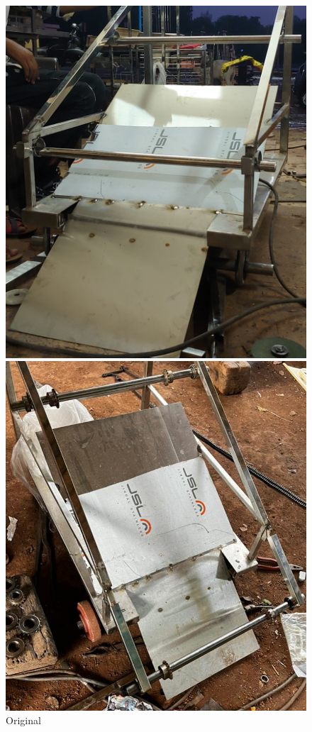 \begin{figure}[H]
  \centering
    \begin{minipage}{0.40\textwidth}
    \centering
      \includegraphics[width=1\textwidth]{Original.jpg}
      \caption{Original}
      \label{fig:Original}
    \end{minipage}
    \begin{minipage}{0.40\textwidth}
    \centering
      \includegraphics[width=1\textwidth]{Improved.jpg}

\end{minipage}
\end{figure}

